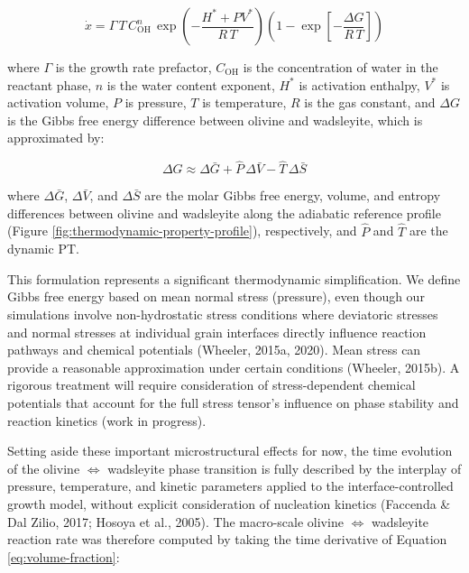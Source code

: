 \documentclass[draft,linenumbers]{agujournal2019}
\begin{document}
\begin{equation}
  \dot{x} = \Gamma\, T\, C_\mathrm{OH}^n\, \exp\!\left(-\frac{H^{\ast} + P V^{\ast}}{R\, T}\right) \left(1 - \exp\!\left[-\frac{\Delta G}{R\, T}\right] \right)
  \label{eq:growth-rate}
\end{equation}

where \(\Gamma\) is the growth rate prefactor, \(C_\mathrm{OH}\) is the
concentration of water in the reactant phase, \(n\) is the water content
exponent, \(H^{\ast}\) is activation enthalpy, \(V^{\ast}\) is
activation volume, \(P\) is pressure, \(T\) is temperature, \(R\) is the
gas constant, and \(\Delta G\) is the Gibbs free energy difference
between olivine and wadsleyite, which is approximated by:

\begin{equation}
  \Delta G \approx \Delta \bar{G} + \hat{P}\, \Delta \bar{V} - \hat{T}\, \Delta \bar{S}
  \label{eq:gibbs}
\end{equation}

where \(\Delta \bar{G}\), \(\Delta \bar{V}\), and \(\Delta \bar{S}\) are
the molar Gibbs free energy, volume, and entropy differences between
olivine and wadsleyite along the adiabatic reference profile (Figure
\ref{fig:thermodynamic-property-profile}), respectively, and \(\hat{P}\)
and \(\hat{T}\) are the dynamic PT.

This formulation represents a significant thermodynamic simplification.
We define Gibbs free energy based on mean normal stress (pressure), even
though our simulations involve non-hydrostatic stress conditions where
deviatoric stresses and normal stresses at individual grain interfaces
directly influence reaction pathways and chemical potentials (Wheeler,
2015a, 2020). Mean stress can provide a reasonable approximation under
certain conditions (Wheeler, 2015b). A rigorous treatment will require
consideration of stress-dependent chemical potentials that account for
the full stress tensor's influence on phase stability and reaction
kinetics (work in progress).

Setting aside these important microstructural effects for now, the time
evolution of the olivine \(\Leftrightarrow\) wadsleyite phase transition
is fully described by the interplay of pressure, temperature, and
kinetic parameters applied to the interface-controlled growth model,
without explicit consideration of nucleation kinetics (Faccenda \& Dal
Zilio, 2017; Hosoya et al., 2005). The macro-scale olivine
\(\Leftrightarrow\) wadsleyite reaction rate was therefore computed by
taking the time derivative of Equation \ref{eq:volume-fraction}:
\end{document}
